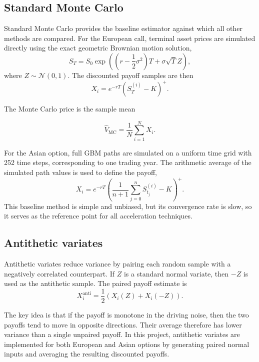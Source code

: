 \documentclass[11pt]{article}
\begin{document}
\subsection{Standard Monte Carlo}

Standard Monte Carlo provides the baseline estimator against which all other methods are compared. For the European call, terminal asset prices are simulated directly using the exact geometric Brownian motion solution,
\begin{equation}
S_T = S_0 \exp\left(\left(r - \frac{1}{2}\sigma^2\right)T + \sigma \sqrt{T}Z\right),
\end{equation}
where $Z \sim \mathcal{N}(0,1)$. The discounted payoff samples are then
\begin{equation}
X_i = e^{-rT}(S_T^{(i)} - K)^+.
\end{equation}

The Monte Carlo price is the sample mean

\begin{equation}
\hat{V}_{\mathrm{MC}} = \frac{1}{N}\sum_{i=1}^{N} X_i.
\end{equation}

For the Asian option, full GBM paths are simulated on a uniform time grid with 252 time steps, corresponding to one trading year. The arithmetic average of the simulated path values is used to define the payoff,
\begin{equation}
X_i = e^{-rT}\left(\frac{1}{n+1}\sum_{j=0}^{n} S_{t_j}^{(i)} - K\right)^+.
\end{equation}
This baseline method is simple and unbiased, but its convergence rate is slow, so it serves as the reference point for all acceleration techniques.

\subsection{Antithetic variates}

Antithetic variates reduce variance by pairing each random sample with a negatively correlated counterpart. If $Z$ is a standard normal variate, then $-Z$ is used as the antithetic sample. The paired payoff estimate is
\begin{equation}
X_i^{\mathrm{anti}} = \frac{1}{2}\left(X_i(Z) + X_i(-Z)\right).
\end{equation}

The key idea is that if the payoff is monotone in the driving noise, then the two payoffs tend to move in opposite directions. Their average therefore has lower variance than a single unpaired payoff. In this project, antithetic variates are implemented for both European and Asian options by generating paired normal inputs and averaging the resulting discounted payoffs.
\end{document}
